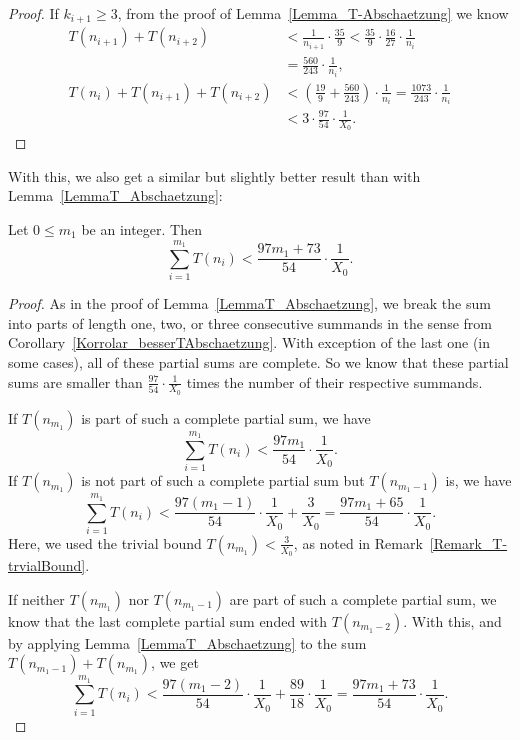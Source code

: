 \documentclass[12pt,reqno]{article}
\begin{document}
\begin{proof}
If $k_{i+1}\geq 3$, from the proof of Lemma~\ref{Lemma_T-Abschaetzung} we know
\begin{align*}
T(n_{i+1})+T(n_{i+2}) &< \frac{1}{n_{i+1}} \cdot \frac{35}{9} < \frac{35}{9} \cdot \frac{16}{27} \cdot \frac{1}{n_i}\\
\quad &= \frac{560}{243} \cdot \frac{1}{n_i},\\
T(n_i)+ T(n_{i+1})+T(n_{i+2}) &< \left(\frac{19}{9}+\frac{560}{243}\right) \cdot \frac{1}{n_i} =\frac{1073}{243} \cdot \frac{1}{n_i}\\
\quad &< 3 \cdot \frac{97}{54} \cdot \frac{1}{X_0}.
\end{align*}
\end{proof}

With this, we also get a similar but slightly better result than with Lemma~\ref{LemmaT_Abschaetzung}:

\begin{theorem}\label{Theorem_bessereT_Summe}
Let $0\leq m_1$ be an integer. Then
\[ \sum_{i=1}^{m_1} T(n_i)<\frac{97m_1+73}{54} \cdot \frac{1}{X_0}.\]
\end{theorem}

\begin{proof}
As in the proof of Lemma~\ref{LemmaT_Abschaetzung}, we break the sum into parts of length one, two, or three consecutive summands in the sense from Corollary~\ref{Korrolar_besserTAbschaetzung}. With exception of the last one (in some cases), all of these partial sums are complete. So we know that these partial sums are smaller than $\tfrac{97}{54} \cdot \tfrac{1}{X_0}$ times the number of their respective summands. 

If $T(n_{m_1})$ is part of such a complete partial sum, we have 
\[ \sum_{i=1}^{m_1} T(n_i)<\frac{97m_1}{54} \cdot \frac{1}{X_0}.\]
If $T(n_{m_1})$ is not part of such a complete partial sum but $T(n_{m_1-1})$ is, we have 
\[ \sum_{i=1}^{m_1} T(n_i)<\frac{97(m_1-1)}{54} \cdot \frac{1}{X_0} + \frac{3}{X_0}=\frac{97m_1+65}{54} \cdot \frac{1}{X_0}.\]
Here, we used the trivial bound $T(n_{m_1})<\tfrac{3}{X_0}$, as noted in Remark~\ref{Remark_T-trvialBound}.

If neither $T(n_{m_1})$ nor $T(n_{m_1-1})$ are part of such a complete partial sum, we know that the last complete partial sum ended with $T(n_{m_1-2})$. With this, and by applying Lemma~\ref{LemmaT_Abschaetzung} to the sum 
 $T(n_{m_1-1})+T(n_{m_1})$, we get
\[ \sum_{i=1}^{m_1} T(n_i)<\frac{97(m_1-2)}{54} \cdot \frac{1}{X_0} + \frac{89}{18} \cdot \frac{1}{X_0}=\frac{97m_1+73}{54} \cdot \frac{1}{X_0}.\]
\end{proof}
\end{document}
